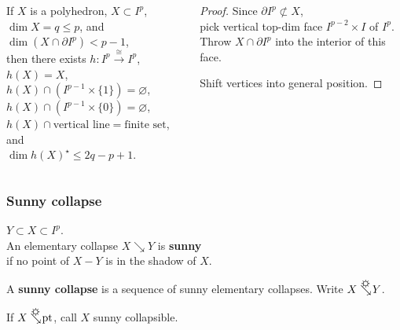 \documentclass[14pt]{beamer}
\newcommand{\collapses}{\searrow}
\newcommand{\sunnycollapses}{\searrow\hspace{-12pt}\mbox{\raisebox{5pt}{\sun}}\hspace{2pt}}
\newcommand{\setbackgroundpicture}[1]{%
\usebackgroundtemplate{
\begin{pgfpicture}{0in}{0in}{\paperwidth}{\paperheight}
\pgfputat{\pgfxy(0,0)}{\texttt{[image: \#1]}}
\color{white}
\pgfsetfillopacity{0.8}
\pgfrect[fill]{\pgfxy(0,0)}{\pgfpoint{\paperwidth}{\paperheight}}
\end{pgfpicture}
}
}
\newcommand{\clearbackgroundpicture}{\usebackgroundtemplate{}}
\begin{document}
\begin{frame}
  \begin{columns}
    \begin{column}{0.5\textwidth}
  \begin{lemma}
    If $X$ is a polyhedron, $X \subset I^p$, \\
    $\dim X = q \leq p$, and \\
    $\dim (X \cap \partial I^p) < p - 1$, \\
    then there exists
    $h : I^p \stackrel{\cong}{\longrightarrow} I^p$, \\
    $h(X) = X$, \\
    $h(X) \cap \left( I^{p-1} \times \{1\} \right) = \varnothing $, \\
    $h(X) \cap \left( I^{p-1} \times \{0\} \right) = \varnothing $, \\
    $h(X) \cap \mbox{vertical line} = \mbox{finite set}$, and \\
    $\dim h(X)^\star \leq 2q - p + 1$.
  \end{lemma}
  \end{column}
  \begin{column}{0.5\textwidth}
    \pause
    \begin{proof}
      Since $\partial I^p \not\subset X$, \\
      pick vertical
      top-dim face $I^{p-2} \times I$ of $I^p$. \\
      Throw $X
      \cap \partial I^p$ into the interior of this face.

\pause
      \vspace{1ex} Shift vertices into general position.\pause
    \end{proof}
  \end{column}
  \end{columns}
\end{frame}
\clearbackgroundpicture

\setbackgroundpicture{sunny-street.jpg}
\begin{frame}
  \frametitle{Sunny collapse}

  $Y \subset X \subset I^p$. \\
  An elementary collapse $X \collapses Y$ is \textbf{sunny} \\
  if no point of $X - Y$ is in the shadow of $X$.

  \vfill A \textbf{sunny collapse} is a sequence of sunny elementary
  collapses.  \pause Write $X \sunnycollapses Y$.

  \vfill If $X \sunnycollapses \mbox{pt}$, call $X$ sunny collapsible.
\end{frame}
\clearbackgroundpicture
\end{document}
